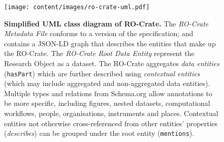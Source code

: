 
\begin{figure}[t!]
    \centering
    \texttt{[image: content/images/ro-crate-uml.pdf]}
    \caption{\textbf{Simplified UML class diagram of RO-Crate.} The \emph{RO-Crate Metadata File} conforms to a version of the specification; and contains a JSON-LD graph that describes the entities that make up the RO-Crate. The \emph{RO-Crate Root Data Entity} represent the Research Object as a dataset. The RO-Crate aggregates \emph{data entities} (\texttt{hasPart}) which are further described using \emph{contextual entities} (which may include aggregated and non-aggregated data entities). Multiple types and relations from Schema.org allow annotations to be more specific, including figures, nested datasets, computational workflows, people, organisations, instruments and places. Contextual entities not otherwise cross-referenced from other entities' properties (\emph{describes}) can be grouped under the root entity (\texttt{mentions}).}
    \label{fig:uml}
\end{figure}
